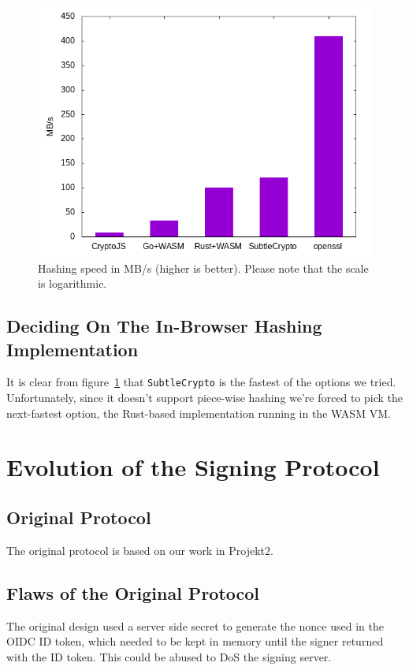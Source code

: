 \begin{figure}
    \begin{center}
        \includegraphics[width=0.7\linewidth]{images/hashingperformance.png}
        \caption{Hashing speed in MB/s (higher is better). Please note that the scale is logarithmic.}
        \label{fig:hashingperformance}
    \end{center}
\end{figure}


\subsection{Deciding On The In-Browser Hashing Implementation}
\label{subsec:deciding-on-the-in-browser-hashing-implementation}
It is clear from figure~\ref{fig:hashingperformance} that \texttt{SubtleCrypto} is the fastest of the options we tried.
Unfortunately, since it doesn't support piece-wise hashing we're forced to pick the next-fastest option,
the Rust-based implementation running in the \gls{WASM} \gls{VM}.

\section{Evolution of the Signing Protocol}
\label{sec:signingprotocol}

\subsection{Original Protocol}
The original protocol is based on our work in Projekt2.

\subsection{Flaws of the Original Protocol}
The original design used a server side secret to generate the nonce used in the \gls{OIDC} ID token, which needed to be kept in memory until the signer returned with the ID token. This could be abused to \gls{DoS} the signing server.

